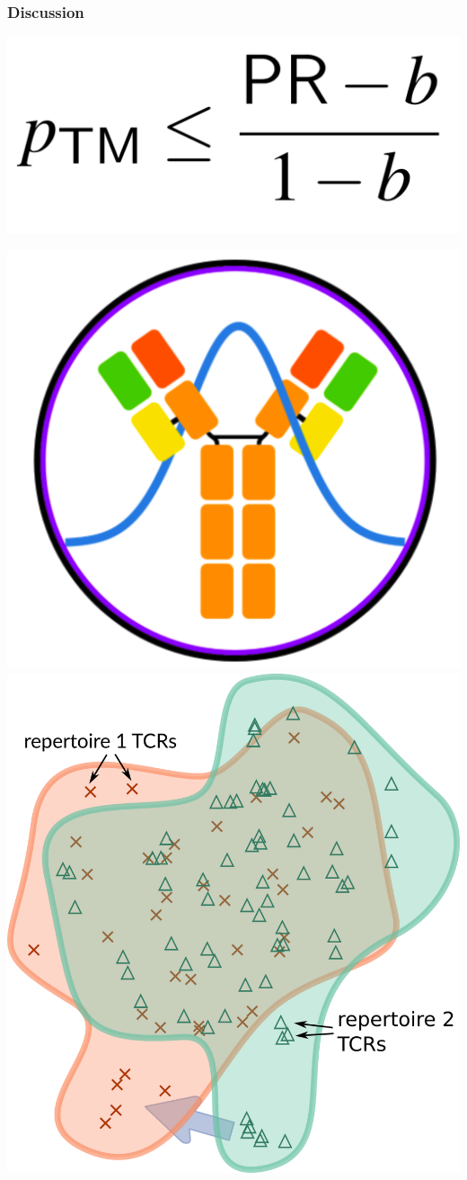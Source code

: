 \documentclass[mathserif,compress,xcolor={dvipsnames}]{beamer}
\renewcommand\;{\,}
\begin{document}
\begin{frame}\frametitle{Discussion}
\begin{center}
\includegraphics[width=0.35\linewidth]{Images/tm_bound.png}
\end{center}
\vspace{2em}
\begin{center}
\includegraphics[width=0.3\linewidth]{Images/sumrep_logo.png}
\hspace{6em}
\includegraphics[width=0.25\linewidth]{Images/transport-cartoon.png}
\end{center}
\end{frame}
\end{document}
